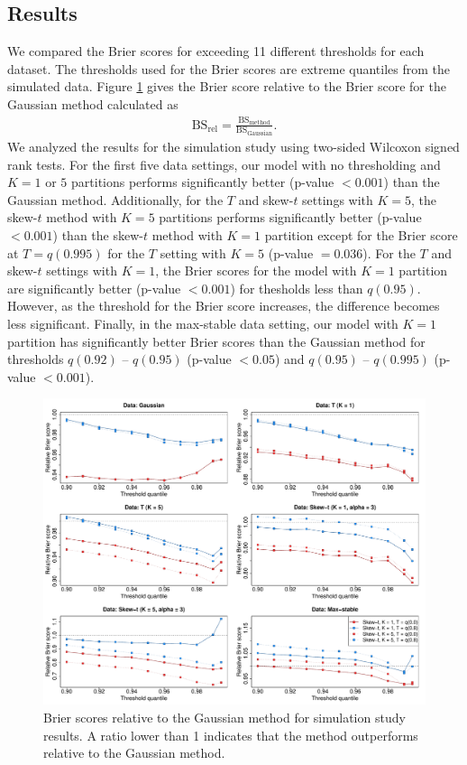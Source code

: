 \documentclass[11pt]{article}
\begin{document}
\subsection{Results}\label{s:simresults}
We compared the Brier scores for exceeding 11 different thresholds for each dataset.
The thresholds used for the Brier scores are extreme quantiles from the simulated data.
Figure \ref{fig:simbrierscores} gives the Brier score relative to the Brier score for the Gaussian method calculated as
\begin{align*}
  \text{BS}_{\text{rel}} = \frac{\text{BS}_{\text{method}}}{\text{BS}_{\text{Gaussian}}}.
\end{align*}
We analyzed the results for the simulation study using two-sided Wilcoxon signed rank tests.
For the first five data settings, our model with no thresholding and $K = 1$ or $5$ partitions performs significantly better (p-value $<0.001$) than the Gaussian method.
Additionally, for the $T$ and skew-$t$ settings with $K = 5$, the skew-$t$ method with $K=5$ partitions performs significantly better (p-value $<0.001$) than the skew-$t$ method with $K=1$ partition except for the Brier score at $T = q(0.995)$ for the $T$ setting with $K = 5$ (p-value $=0.036$).
For the $T$ and skew-$t$ settings with $K = 1$, the Brier scores for the model with $K = 1$ partition are significantly better (p-value $<0.001$) for thesholds less than $q(0.95)$.
However, as the threshold for the Brier score increases, the difference becomes less significant.
Finally, in the max-stable data setting, our model with $K=1$ partition has significantly better Brier scores than the Gaussian method for thresholds $q(0.92)$ -- $q(0.95)$ (p-value $<0.05$) and $q(0.95)$ -- $q(0.995)$ (p-value $<0.001$).

\begin{figure}
  \includegraphics[width=\linewidth]{plots/bsplots-mean.pdf}
  \caption{Brier scores relative to the Gaussian method for simulation study results. A ratio lower than 1 indicates that the method outperforms relative to the Gaussian method.}
  \label{fig:simbrierscores}
\end{figure}
\end{document}
